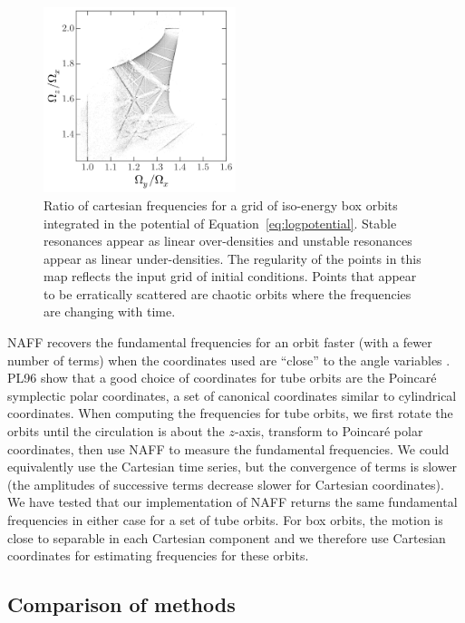 \documentclass[letterpaper,12pt,preprint]{aastex}
\begin{document}
\begin{figure}[!h]
\begin{center}
\includegraphics[width=0.5\textwidth]{figures/log-freqmap.png}
\caption{Ratio of cartesian frequencies for a grid of iso-energy box orbits integrated in the potential of Equation~\ref{eq:logpotential}. Stable resonances appear as linear over-densities and unstable resonances appear as linear under-densities. The regularity of the points in this map reflects the input grid of initial conditions. Points that appear to be erratically scattered are chaotic orbits where the frequencies are changing with time.} \label{fig:logfreqs}
\end{center}
\end{figure}

NAFF recovers the fundamental frequencies for an orbit faster (with a fewer number of terms) when the coordinates used are ``close'' to the angle variables \cite[PL96][]{papaphilippou96}. PL96 show that a good choice of coordinates for tube orbits are the Poincar\'e symplectic polar coordinates, a set of canonical coordinates similar to cylindrical coordinates. When computing the frequencies for tube orbits, we first rotate the orbits until the circulation is about the $z$-axis, transform to Poincar\'e polar coordinates, then use NAFF to measure the fundamental frequencies. We could equivalently use the Cartesian time series, but the convergence of terms is slower (the amplitudes of successive terms decrease slower for Cartesian coordinates). We have tested that our implementation of NAFF returns the same fundamental frequencies in either case for a set of tube orbits. For box orbits, the motion is close to separable in each Cartesian component and we therefore use Cartesian coordinates for estimating frequencies for these orbits.

\subsection{Comparison of methods}\label{sec:comparison}
\end{document}
